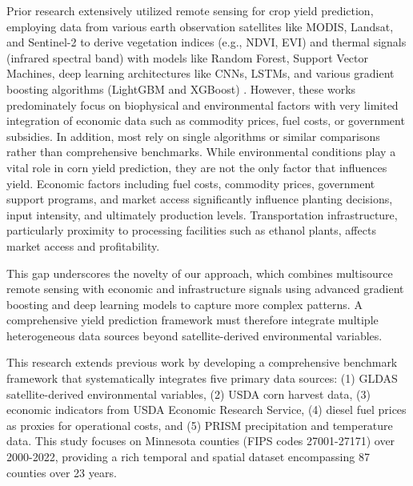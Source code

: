 \documentclass[twocolumn]{article}
\begin{document}
Prior research extensively utilized remote sensing for crop yield prediction, employing data from various earth observation satellites like MODIS, Landsat, and Sentinel-2 to derive vegetation indices (e.g., NDVI, EVI) and thermal signals (infrared spectral band) with models like Random Forest, Support Vector Machines, deep learning architectures like CNNs, LSTMs, and various gradient boosting algorithms (LightGBM and XGBoost) \cite{kayad2019, nevavuori2020, prasetyo2024, roy2025, shahhosseini2021, singh2025, sentinel2025, chen2016, ke2017}. However, these works predominately focus on biophysical and environmental factors with very limited integration of economic data such as commodity prices, fuel costs, or government subsidies. In addition, most rely on single algorithms or similar comparisons rather than comprehensive benchmarks. While environmental conditions play a vital role in corn yield prediction, they are not the only factor that influences yield. Economic factors including fuel costs, commodity prices, government support programs, and market access significantly influence planting decisions, input intensity, and ultimately production levels. \cite{usda_ers} Transportation infrastructure, particularly proximity to processing facilities such as ethanol plants, affects market access and profitability.

This gap underscores the novelty of our approach, which combines multisource remote sensing with economic and infrastructure signals using advanced gradient boosting and deep learning models to capture more complex patterns. A comprehensive yield prediction framework must therefore integrate multiple heterogeneous data sources beyond satellite-derived environmental variables.

This research extends previous work by developing a comprehensive benchmark framework that systematically integrates five primary data sources: (1) GLDAS satellite-derived environmental variables, (2) USDA corn harvest data, (3) economic indicators from USDA Economic Research Service, (4) diesel fuel prices as proxies for operational costs, and (5) PRISM precipitation and temperature data. This study focuses on Minnesota counties (FIPS codes 27001-27171) over 2000-2022, providing a rich temporal and spatial dataset encompassing 87 counties over 23 years.
\end{document}
